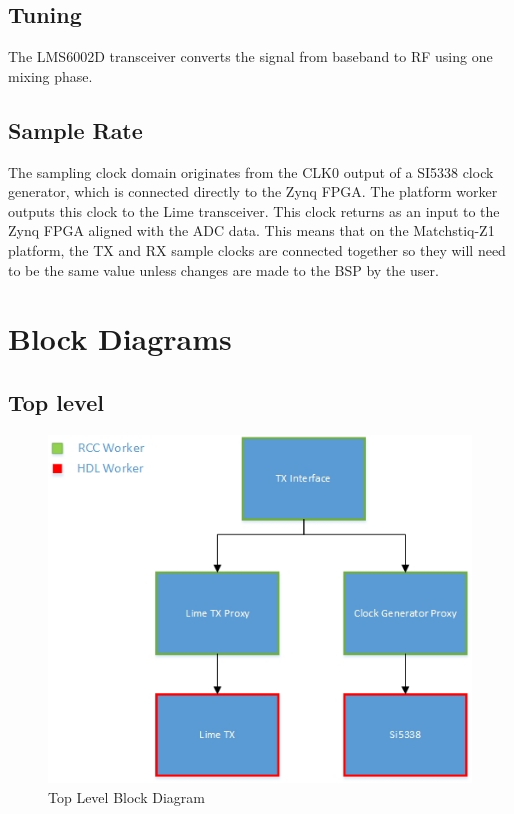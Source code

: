 \documentclass{article}
\begin{document}
\subsection*{Tuning}
The LMS6002D transceiver converts the signal from baseband to RF using one mixing phase.
\subsection*{Sample Rate}
The sampling clock domain originates from  the CLK0 output of a SI5338 clock generator, which is connected directly to the Zynq FPGA. The platform worker outputs this clock to the Lime transceiver.  This clock returns as an input to the Zynq FPGA aligned with the ADC data. This means that on the Matchstiq-Z1 platform, the TX and RX sample clocks are connected together so they will need to be the same value unless changes are made to the BSP by the user.
\newpage

\section*{Block Diagrams}
\subsection*{Top level}
\begin{figure}[ht]
	\centerline{\includegraphics[scale=0.7]{matchstiq_FE_TX_toplevel}}
	\caption{Top Level Block Diagram}
	\label{fig:top}
\end{figure}
\vspace{25 mm}
\end{document}
